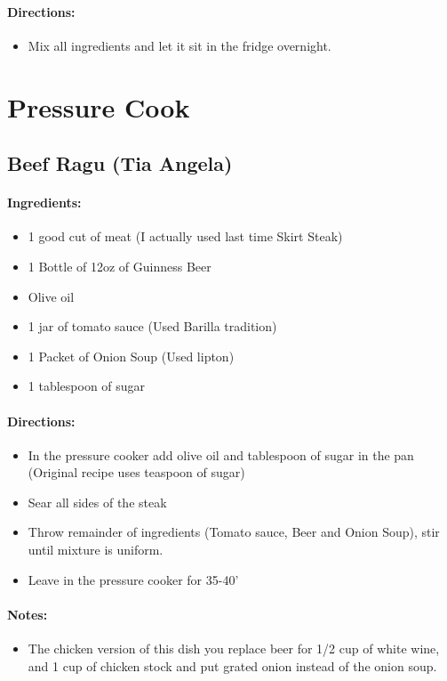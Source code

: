 \documentclass{article}
\begin{document}
\paragraph{Directions:}
\begin{itemize}
    \item Mix all ingredients and let it sit in the fridge overnight.
\end{itemize}

\section{Pressure Cook}


\subsection{Beef Ragu (Tia Angela)}

\paragraph{Ingredients:}
\begin{itemize}
    \item 1 good cut of meat (I actually used last time Skirt Steak)
    \item 1 Bottle of 12oz of Guinness Beer
    \item Olive oil
    \item 1 jar of tomato sauce (Used Barilla tradition)
    \item 1 Packet of Onion Soup (Used lipton)
    \item 1 tablespoon of sugar
\end{itemize}

\paragraph{Directions:}
\begin{itemize}
    \item In the pressure cooker add olive oil and tablespoon of sugar in the pan (Original recipe uses teaspoon of sugar)
    \item Sear all sides of the steak
    \item Throw remainder of ingredients (Tomato sauce, Beer and Onion Soup), stir until mixture is uniform.
    \item Leave in the pressure cooker for 35-40'
\end{itemize}

\paragraph{Notes:}
\begin{itemize}
    \item The chicken version of this dish you replace beer for 1/2 cup of white wine, and 1 cup of chicken stock and put grated onion instead of the onion soup.
\end{itemize}
\end{document}
